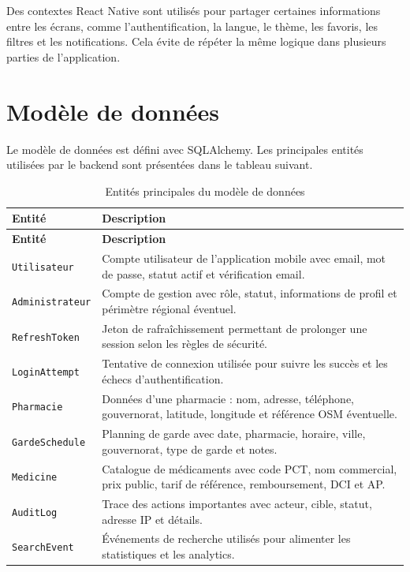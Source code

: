 Des contextes React Native sont utilisés pour partager certaines informations entre les écrans, comme
l'authentification, la langue, le thème, les favoris, les filtres et les notifications. Cela évite de répéter
la même logique dans plusieurs parties de l'application.

\section{Modèle de données}

Le modèle de données est défini avec SQLAlchemy. Les principales entités utilisées par le backend sont
présentées dans le tableau suivant.

\begin{longtable}{L{4cm}L{10cm}}
    \caption{Entités principales du modèle de données}\\
    \toprule
    \textbf{Entité} & \textbf{Description} \\
    \midrule
    \endfirsthead
    \toprule
    \textbf{Entité} & \textbf{Description} \\
    \midrule
    \endhead
    \texttt{Utilisateur} & Compte utilisateur de l'application mobile avec email, mot de passe, statut actif et vérification email. \\
    \texttt{Administrateur} & Compte de gestion avec rôle, statut, informations de profil et périmètre régional éventuel. \\
    \texttt{RefreshToken} & Jeton de rafraîchissement permettant de prolonger une session selon les règles de sécurité. \\
    \texttt{LoginAttempt} & Tentative de connexion utilisée pour suivre les succès et les échecs d'authentification. \\
    \texttt{Pharmacie} & Données d'une pharmacie : nom, adresse, téléphone, gouvernorat, latitude, longitude et référence OSM éventuelle. \\
    \texttt{GardeSchedule} & Planning de garde avec date, pharmacie, horaire, ville, gouvernorat, type de garde et notes. \\
    \texttt{Medicine} & Catalogue de médicaments avec code PCT, nom commercial, prix public, tarif de référence, remboursement, DCI et AP. \\
    \texttt{AuditLog} & Trace des actions importantes avec acteur, cible, statut, adresse IP et détails. \\
    \texttt{SearchEvent} & Événements de recherche utilisés pour alimenter les statistiques et les analytics. \\
    \bottomrule
\end{longtable}

